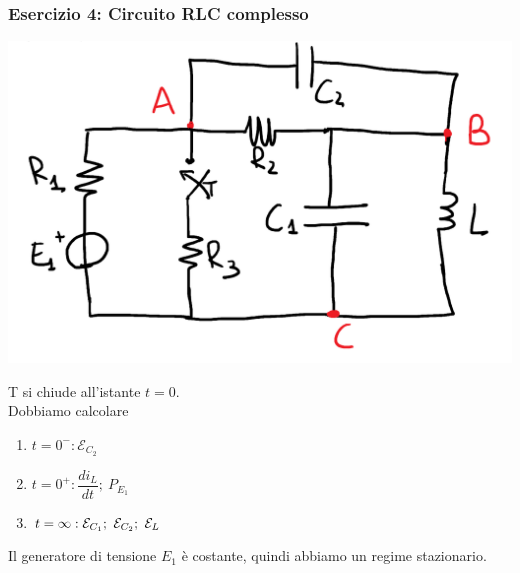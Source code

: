 \documentclass{article}
\begin{document}
\subsubsection{Esercizio 4: Circuito RLC complesso}
\begin{center}
    \includegraphics[scale=0.27]{Image/Es_4_Trans_0.png}
\end{center}
T si chiude all'istante $t=0$.\\
Dobbiamo calcolare 
\begin{enumerate}
    \item $t=0^-:\mathcal{E}_{C_2}$ 
    \item $t=0^+: \dfrac{di_L}{dt}; \ P_{E_1}$
    \item $t=\infty: \Varepsilon_{C_1}; \ \Varepsilon_{C_2}; \ \Varepsilon_{L}$
\end{enumerate}
Il generatore di tensione $E_1$ è costante, quindi abbiamo un regime stazionario.
\end{document}
